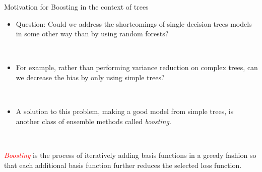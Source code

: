 \documentclass[
  10pt,
  ignorenonframetext,
]{beamer}
\providecommand{\tightlist}{%
  \setlength{\itemsep}{0pt}\setlength{\parskip}{0pt}}
\begin{document}
\begin{frame}
\begin{block}{Motivation for Boosting in the context of trees}
\protect\hypertarget{motivation-for-boosting-in-the-context-of-trees}{}
\(~\)

\begin{itemize}
\tightlist
\item
  Question: Could we address the shortcomings of single decision trees
  models in some other way than by using random forests?
\end{itemize}

\(~\)

\begin{itemize}
\tightlist
\item
  For example, rather than performing variance reduction on complex
  trees, can we decrease the bias by only using simple trees?
\end{itemize}

\(~\)

\begin{itemize}
\tightlist
\item
  A solution to this problem, making a good model from simple trees, is
  another class of ensemble methods called \emph{boosting}.
\end{itemize}

\(~\)

\emph{\textcolor{red}{Boosting}} is the process of iteratively adding
basis functions in a greedy fashion so that each additional basis
function further reduces the selected loss function.
\end{block}
\end{frame}
\end{document}
